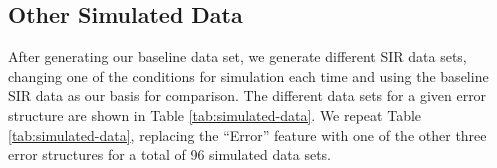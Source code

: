 \documentclass[12pt]{article}
\begin{document}
      \subsection{Other Simulated Data}

After generating our baseline data set, we  generate different SIR data sets, changing one of the conditions for simulation each time and using the baseline SIR data as our basis for comparison. The different data sets for a given error structure are shown in Table \ref{tab:simulated-data}.  We repeat  Table \ref{tab:simulated-data}, replacing the ``Error'' feature with  one of the other three error structures for a total of 96 simulated data sets.


\end{document}
